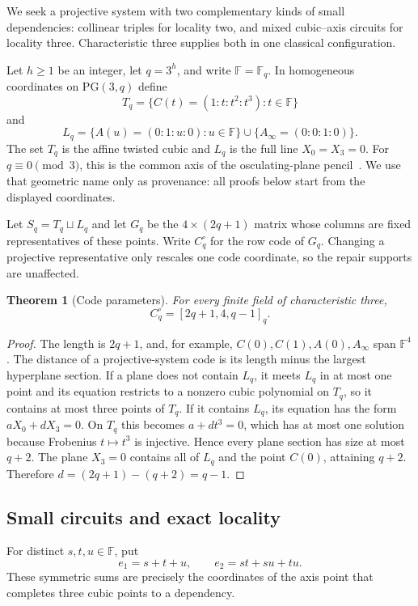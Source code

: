 \documentclass[11pt]{article}
\newtheorem{theorem}{Theorem}[section]
\theoremstyle{definition}
\theoremstyle{remark}
\newcommand{\F}{\mathbb{F}}
\begin{document}
We seek a projective system with two complementary kinds of small
dependencies: collinear triples for locality two, and mixed
cubic--axis circuits for locality three.  Characteristic three supplies both
in one classical configuration.

Let $h\geq1$ be an integer, let $q=3^h$, and write $\F=\F_q$.  In homogeneous coordinates on
$\mathrm{PG}(3,q)$ define
\[
 T_q=\{C(t)=(1:t:t^2:t^3):t\in\F\}
\]
and
\[
 L_q=\{A(u)=(0:1:u:0):u\in\F\}\cup\{A_\infty=(0:0:1:0)\}.
\]
The set $T_q$ is the affine twisted cubic and $L_q$ is the full line
$X_0=X_3=0$.  For $q\equiv0\pmod3$, this is the common axis of the
osculating-plane pencil~\cite[Section~7]{DavydovEtAl2021}.  We use that
geometric name only as provenance: all proofs below start from the displayed
coordinates.

Let $S_q=T_q\sqcup L_q$ and let $G_q$ be the $4\times(2q+1)$ matrix whose
columns are fixed representatives of these points.  Write $C_q^\circ$ for the row
code of $G_q$.  Changing a projective representative only rescales one code
coordinate, so the repair supports are unaffected.

\begin{theorem}[Code parameters]\label{thm:parameters}
For every finite field of characteristic three,
\[
 C_q^\circ=[2q+1,4,q-1]_q.
\]
\end{theorem}

\begin{proof}
The length is $2q+1$, and, for example,
$C(0),C(1),A(0),A_\infty$ span $\F^4$.  The distance
of a projective-system code is its length minus the largest hyperplane
section.  If a plane does not contain $L_q$, it meets $L_q$ in at most one
point and its equation restricts to a nonzero cubic polynomial on $T_q$, so
it contains at most three points of $T_q$.  If it contains $L_q$, its
equation has the form $aX_0+dX_3=0$.  On $T_q$ this becomes $a+dt^3=0$,
which has at most one solution because Frobenius $t\mapsto t^3$ is
injective.  Hence every plane section has size at most $q+2$.  The plane
$X_3=0$ contains all of $L_q$ and the point $C(0)$, attaining $q+2$.
Therefore $d=(2q+1)-(q+2)=q-1$.
\end{proof}

\subsection{Small circuits and exact locality}

For distinct $s,t,u\in\F$, put
\[
 e_1=s+t+u,\qquad e_2=st+su+tu.
\]
These symmetric sums are precisely the coordinates of the axis point that
completes three cubic points to a dependency.
\end{document}
